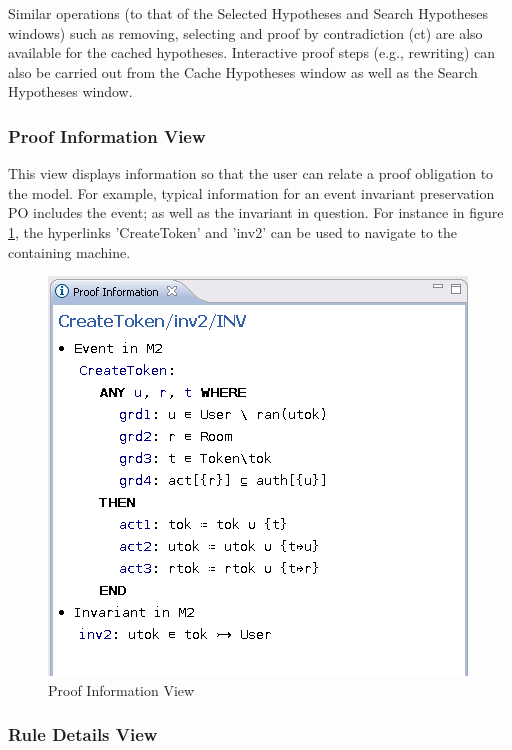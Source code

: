 Similar operations (to that of the Selected Hypotheses and Search Hypotheses windows) such as removing, selecting and proof by contradiction (ct) are also available for the cached hypotheses. Interactive proof steps (e.g., rewriting) can also be carried out from the Cache Hypotheses window as well as the Search Hypotheses window. 

\subsubsection{Proof Information View}

This view displays information so that the user can relate a proof obligation to the model. For example, typical information for an event invariant preservation PO includes the event; as well as the invariant in question. For instance in figure \ref{fig_ref_01_proving_perspective8}, the hyperlinks 'CreateToken' and 'inv2' can be used to navigate to the containing machine. 

\begin{figure}[!h]
\begin{center}
	\includegraphics{img/reference/ref_01_proving_perspective8.png}
	\caption{Proof Information View}
	\label{fig_ref_01_proving_perspective8}
\end{center}
\end{figure}

\subsubsection{Rule Details View}

